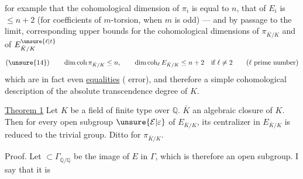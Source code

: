 for example that the cohomological dimension of $\pi_i$ is equal to $n$, that of $E_i$ is $\leq n+2$ (for coefficients  of $m$-torsion, when $m$ is odd) --- and by passage to the limit, corresponding upper bounds for the cohomological dimensions of $\pi_{\bar K/K}$ and of $E_{\bar K/K}^{\unsure{\ell|t}}$
\[
(\unsure{14})\qquad \dim\operatorname{coh}\pi_{\bar K/K}\leq n,\qquad
\dim\operatorname{coh}_{\ell}E_{\bar K/K}\leq n+2\quad\text{if }\ell\neq2
\qquad(\ell\text{ prime number})
\]
which are in fact even \uline{equalities} ( error), and therefore  a simple cohomological description of the absolute transcendence degree of $K$.

\uline{Theorem 1} Let $K$ be a field  of finite type over $\mathbb Q$.  $\bar K$ an algebraic closure of $K$. Then for every open subgroup $\unsure{\mathcal E|\varepsilon}$ of $E_{\bar K/K}$, its centralizer in $E_{\bar K/K}$ is reduced to the trivial group. Ditto for $\pi_{\bar K/K}$.

Proof. Let $\subset\Gamma_{\overline{\mathbb Q}/\mathbb Q}$ be the image of $E$ in $\Gamma$, which is therefore an open subgroup.   I say that it is
